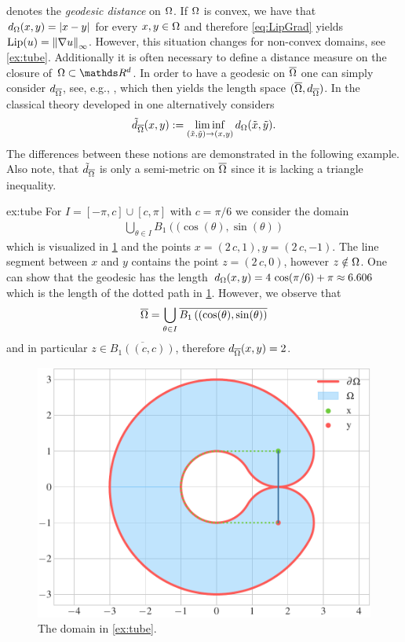 %
denotes the \emph{geodesic distance} on $\Omega$. If $\Omega$ is convex, we have that $d_\Omega(x,y) = \left|x-y\right|$ for every 
$x,y\in \Omega$ and therefore \cref{eq:LipGrad} yields $\operatorname{Lip}(u) = \left\|\nabla u\right\|_\infty$. However, this situation changes for non-convex domains, see \cref{ex:tube}. Additionally it is often necessary to define 
a distance measure on the closure of $\domain\subset\R^d$. In order to have a geodesic on $\overline{\Omega}$ one can simply consider $d_{\overline{\Omega}}$, see, e.g., \cite{bungert2021uniform}, which then yields the length space $(\overline{\Omega}, d_{\overline{\Omega}})$. In the classical theory developed in \cite{jensen1993uniqueness} one alternatively considers
%
\begin{align*}
\tilde{d}_{\overline{\Omega}}(x,y) := \liminf_{(\tilde x,\tilde y)\to(x,y)} d_\Omega(\tilde{x},\tilde{y}).
\end{align*}
%
The differences between these notions are demonstrated in the following example. Also note, that $\tilde{d}_{\overline{\Omega}}$ is only a semi-metric on $\overline{\Omega}$ since it is lacking a triangle inequality.
%
\begin{example}{}{ex:tube}
For $I = [-\pi, c]\cup [c, \pi]$ with $c=\pi/6$ we consider the domain
%
\begin{align*}
\bigcup_{\theta \in I} B_1\left((\cos(\theta),\sin(\theta)\right)
\end{align*}
%
which is visualized in \cref{fig:tube} and the points $x=(2\, c, 1), y= (2\, c, -1)$. The 
line segment between $x$ and $y$ contains the point $z=(2\, c, 0)$, however $z\notin \Omega$. One can show that 
the geodesic has the length $d_\Omega(x,y) = 4\, \cos(\pi/6) + \pi \approx 6.606$ which is the length of the dotted path 
in \cref{fig:tube}. However, we observe that 
%
\begin{align*}
\overline{\Omega} = \bigcup_{\theta \in I } 
\overline{B_1\left((\cos(\theta),\sin(\theta)\right)}
\end{align*}
%
and in particular $z\in \overline{B_1\left((c,c)\right)}$, therefore $d_{\overline{\Omega}}(x,y) = 2$.
\end{example}
%
\begin{figure}
\centering
\includegraphics[width=.5\textwidth]{code/domains/tube.pdf}
\caption{The domain in \cref{ex:tube}.}\label{fig:tube}
\end{figure}
%
%
